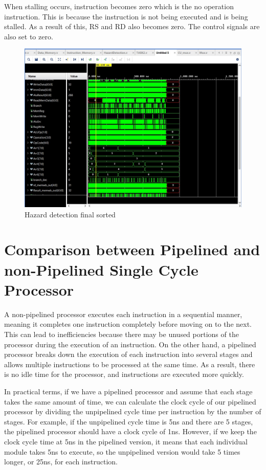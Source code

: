 \documentclass{article}
\begin{document}
When stalling occurs, instruction becomes zero which is the no operation instruction. This is because the instruction is not being executed and is being stalled. As a result of this, RS and RD also becomes zero. The control signals are also set to zero.

\newpage
\begin{figure}[!h]
    \centering
    \includegraphics*[width = 8 cm]{hazarddetectionfinalsorted.jpeg}
    \caption{Hazard detection final sorted}
    \label{fig:label5}
\end{figure}

\section{Comparison between Pipelined and non-Pipelined Single Cycle Processor}

A non-pipelined processor executes each instruction in a sequential manner, meaning it completes one instruction completely before moving on to the next. This can lead to inefficiencies because there may be unused portions of the processor during the execution of an instruction. On the other hand, a pipelined processor breaks down the execution of each instruction into several stages and allows multiple instructions to be processed at the same time. As a result, there is no idle time for the processor, and instructions are executed more quickly.

In practical terms, if we have a pipelined processor and assume that each stage takes the same amount of time, we can calculate the clock cycle of our pipelined processor by dividing the unpipelined cycle time per instruction by the number of stages. For example, if the unpipelined cycle time is 5ns and there are 5 stages, the pipelined processor should have a clock cycle of 1ns. However, if we keep the clock cycle time at 5ns in the pipelined version, it means that each individual module takes 5ns to execute, so the unpipelined version would take 5 times longer, or 25ns, for each instruction.
\end{document}
